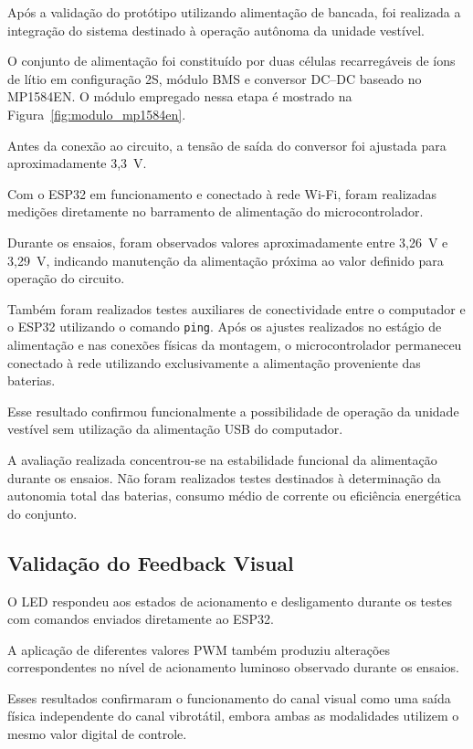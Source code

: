 Após a validação do protótipo utilizando alimentação de bancada, foi realizada a integração do sistema destinado à operação autônoma da unidade vestível.

O conjunto de alimentação foi constituído por duas células recarregáveis de íons de lítio em configuração 2S, módulo BMS e conversor DC--DC baseado no MP1584EN. O módulo empregado nessa etapa é mostrado na Figura~\ref{fig:modulo_mp1584en}.

Antes da conexão ao circuito, a tensão de saída do conversor foi ajustada para aproximadamente 3,3~V.

Com o ESP32 em funcionamento e conectado à rede Wi-Fi, foram realizadas medições diretamente no barramento de alimentação do microcontrolador.

Durante os ensaios, foram observados valores aproximadamente entre 3,26~V e 3,29~V, indicando manutenção da alimentação próxima ao valor definido para operação do circuito.

Também foram realizados testes auxiliares de conectividade entre o computador e o ESP32 utilizando o comando \texttt{ping}. Após os ajustes realizados no estágio de alimentação e nas conexões físicas da montagem, o microcontrolador permaneceu conectado à rede utilizando exclusivamente a alimentação proveniente das baterias.

Esse resultado confirmou funcionalmente a possibilidade de operação da unidade vestível sem utilização da alimentação USB do computador.

A avaliação realizada concentrou-se na estabilidade funcional da alimentação durante os ensaios. Não foram realizados testes destinados à determinação da autonomia total das baterias, consumo médio de corrente ou eficiência energética do conjunto.


\subsection{Validação do Feedback Visual}

O LED respondeu aos estados de acionamento e desligamento durante os testes com comandos enviados diretamente ao ESP32.

A aplicação de diferentes valores PWM também produziu alterações correspondentes no nível de acionamento luminoso observado durante os ensaios.

Esses resultados confirmaram o funcionamento do canal visual como uma saída física independente do canal vibrotátil, embora ambas as modalidades utilizem o mesmo valor digital de controle.

